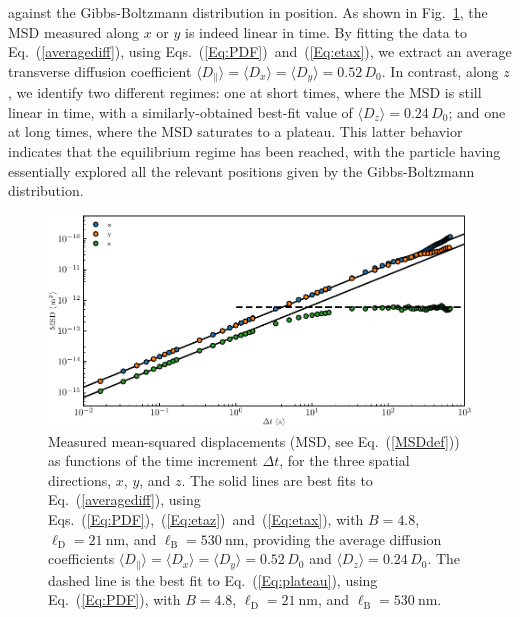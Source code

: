 against the Gibbs-Boltzmann distribution in position. As shown in Fig.~\ref{fig.MSD}, the MSD measured along $x$ or $y$ is indeed linear in time. By fitting the data to Eq.~(\ref{averagediff}), using Eqs.~(\ref{Eq:PDF})~and~(\ref{Eq:etax}), we extract an average transverse diffusion coefficient $\langle D_\parallel \rangle= \langle D_x\rangle=\langle D_y \rangle= 0.52\, D_0$. In contrast, along $z$, we identify two different regimes: one at short times, where the \gls{MSD} is still linear in time, with a similarly-obtained best-fit value of $\langle D_z \rangle= 0.24\, D_0$; and one at long times, where the MSD saturates to a plateau. This latter behavior indicates that the equilibrium regime has been reached, with the particle having essentially explored all the relevant positions given by the Gibbs-Boltzmann distribution.

\begin{figure}[t!]
	\centering
	\includegraphics{02_body/chapter3/images/trajctory_analysis/msd.pdf}
	\caption{Measured mean-squared displacements (MSD, see Eq.~(\ref{MSDdef})) as functions of the time increment $\Delta t$, for the three spatial directions, $x$, $y$, and $z$. The solid lines are best fits to Eq.~(\ref{averagediff}), using Eqs.~(\ref{Eq:PDF}),~(\ref{Eq:etaz})~and~(\ref{Eq:etax}), with $B = 4.8$, $\ell_\mathrm{D} = 21 ~ \mathrm{nm}$, and $\ell_\mathrm{B} = 530~\mathrm{nm}$,
		providing the average diffusion coefficients $\langle{D_\parallel}\rangle= \langle D_x\rangle=\langle D_y \rangle =0.52\,D_0$ and $\langle D_z \rangle =0.24\, D_0$. The dashed line is the best fit to Eq.~(\ref{Eq:plateau}), using Eq.~(\ref{Eq:PDF}), with $B = 4.8$, $\ell_\mathrm{D} = 21 ~ \mathrm{nm}$, and $\ell_\mathrm{B} = 530~\mathrm{nm}$.~\href{https://github.com/eXpensia/Confined-Brownian-Motion/blob/main/02_body/chapter3/images/trajctory_analysis/graph_ploting.ipynb}{\faGithub}}
	\label{fig.MSD}
\end{figure}


